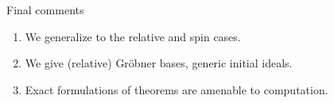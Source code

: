 \begin{frame}{Final comments}

  \begin{remark}
    \begin{enumerate}
    \item We generalize to the relative and spin cases.
    \item We give (relative) Gr\"obner bases, generic initial ideals.
    \item Exact formulations of theorems are amenable to computation.
    \end{enumerate}
  \end{remark}


\end{frame}
